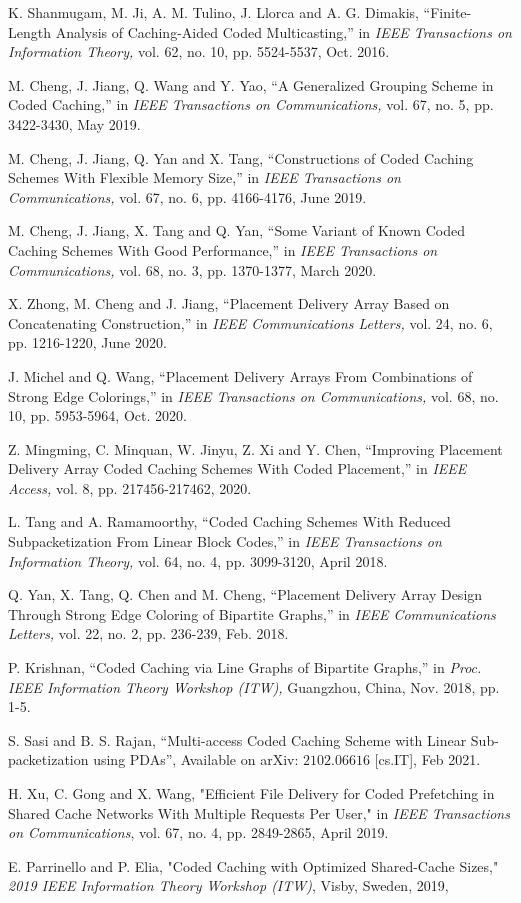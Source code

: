 \documentclass[conference,a4paper,10pt]{IEEEtran}
\begin{document}
\begin{thebibliography}{1}
K. Shanmugam, M. Ji, A. M. Tulino, J. Llorca and A. G. Dimakis, \enquote{Finite-Length Analysis of Caching-Aided Coded Multicasting,} in \textit{IEEE Transactions on Information Theory,} vol. 62, no. 10, pp. 5524-5537, Oct. 2016.

M. Cheng, J. Jiang, Q. Wang and Y. Yao, \enquote{A Generalized Grouping Scheme in Coded Caching,} in \textit{IEEE Transactions on Communications,} vol. 67, no. 5, pp. 3422-3430, May 2019.    


M. Cheng, J. Jiang, Q. Yan and X. Tang, \enquote{Constructions of Coded Caching Schemes With Flexible Memory Size,} in \textit{IEEE Transactions on Communications,} vol. 67, no. 6, pp. 4166-4176, June 2019.


M. Cheng, J. Jiang, X. Tang and Q. Yan, \enquote{Some Variant of Known Coded Caching Schemes With Good Performance,} in \textit{IEEE Transactions on Communications,} vol. 68, no. 3, pp. 1370-1377, March 2020.

X. Zhong, M. Cheng and J. Jiang, \enquote{Placement Delivery Array Based on Concatenating Construction,} in \textit{IEEE Communications Letters,} vol. 24, no. 6, pp. 1216-1220, June 2020.


J. Michel and Q. Wang, \enquote{Placement Delivery Arrays From Combinations of Strong Edge Colorings,} in \textit{IEEE Transactions on Communications,} vol. 68, no. 10, pp. 5953-5964, Oct. 2020.

Z. Mingming, C. Minquan, W. Jinyu, Z. Xi and Y. Chen, \enquote{Improving Placement Delivery Array Coded Caching Schemes With Coded Placement,} in \textit{IEEE Access,} vol. 8, pp. 217456-217462, 2020.

L. Tang and A. Ramamoorthy, \enquote{Coded Caching Schemes With Reduced Subpacketization From Linear Block Codes,} in \textit{IEEE Transactions on Information Theory,} vol. 64, no. 4, pp. 3099-3120, April 2018.

Q. Yan, X. Tang, Q. Chen and M. Cheng, \enquote{Placement Delivery Array Design Through Strong Edge Coloring of Bipartite Graphs,} in \textit{IEEE Communications Letters,} vol. 22, no. 2, pp. 236-239, Feb. 2018.

P. Krishnan, \enquote{Coded Caching via Line Graphs of Bipartite Graphs,} in \textit{ Proc. IEEE Information Theory Workshop (ITW),} Guangzhou, China, Nov. 2018, pp. 1-5.

S. Sasi and B. S. Rajan, \enquote{Multi-access Coded Caching Scheme with Linear Sub-packetization using PDAs}, Available on arXiv: $2102.06616$ [cs.IT], Feb 2021.

H. Xu, C. Gong and X. Wang, "Efficient File Delivery for Coded Prefetching in Shared Cache Networks With Multiple Requests Per User," in \textit{IEEE Transactions on Communications}, vol. 67, no. 4, pp. 2849-2865, April 2019.

E. Parrinello and P. Elia, "Coded Caching with Optimized Shared-Cache Sizes," \textit{2019 IEEE Information Theory Workshop (ITW)}, Visby, Sweden, 2019,


\end{thebibliography}
\end{document}

